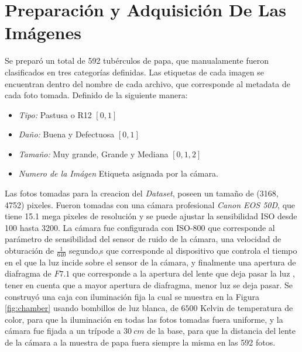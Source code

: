 \section{Preparación y Adquisición De Las Imágenes}

	Se preparó un total de 592 tubérculos de papa, que manualamente fueron clasificados en tres categorías definidas. Las etiquetas de cada imagen se encuentran dentro del nombre de cada archivo, que corresponde al metadata de cada foto tomada. Definido de la siguiente manera:
	
	\begin{itemize}
		\item \textit{Tipo:} Pastusa o R12 $[0,1]$
		\item \textit{Daño:} Buena y Defectuosa $[0,1]$
		\item \textit{Tamaño:} Muy grande, Grande y Mediana $[0,1,2]$
		\item \textit{Numero de la Imágen} Etiqueta asignada por la cámara.
	\end{itemize}	
	
	Las fotos tomadas para la creacion del \textit{Dataset}, poseen un tamaño de (3168, 4752) pixeles. Fueron tomadas con una cámara profesional \textit{Canon EOS 50D}, que tiene 15.1 mega pixeles de resolución y se puede ajustar la sensibilidad ISO desde 100 hasta 3200. La cámara fue configurada con ISO-800 que corresponde al parámetro de sensibilidad del sensor de ruido de la cámara, una velocidad de obturación de $\frac{1}{640}$ segundo,s que corresponde al dispositivo que controla el tiempo en el que la luz incide sobre el sensor de la cámara, y finalmente una apertura de diafragma de $F 7.1$ que corresponde a la apertura del lente que deja pasar la luz \cite{Camara}, tener en cuenta que a mayor apertura de diafragma, menor luz se deja pasar. Se construyó una caja con iluminación fija la cual se muestra en la Figura \ref{fig:chamber} usando bombillos de luz blanca, de $6500$ Kelvin de temperatura de color, para que la iluminación en todas las fotos tomadas fuera uniforme, y la cámara fue fijada a un trípode a $30 \ cm$ de la base, para que la distancia del lente de la cámara a la muestra de papa fuera siempre la misma en las 592 fotos.

